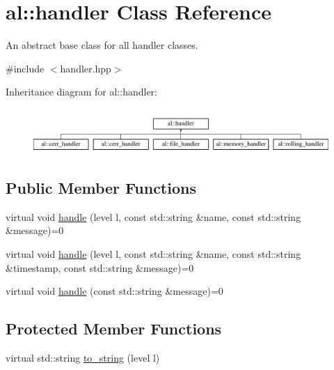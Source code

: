 \hypertarget{classal_1_1handler}{\section{al\-:\-:handler \-Class \-Reference}
\label{classal_1_1handler}
}


\-An abstract base class for all handler classes.  




{\ttfamily \#include $<$handler.\-hpp$>$}

\-Inheritance diagram for al\-:\-:handler\-:\begin{figure}[H]
\begin{center}
\leavevmode
\includegraphics[height=1.723077cm]{classal_1_1handler}
\end{center}
\end{figure}
\subsection*{\-Public \-Member \-Functions}
\begin{DoxyCompactItemize}
\item 
virtual void \hyperlink{classal_1_1handler_a29a3fb2757d02ed144cb71166aad1dfe}{handle} (level l, const std\-::string \&name, const std\-::string \&message)=0
\item 
virtual void \hyperlink{classal_1_1handler_a11ebca923dc7a3f8ffa3f802c5598cb0}{handle} (level l, const std\-::string \&name, const std\-::string \&timestamp, const std\-::string \&message)=0
\item 
virtual void \hyperlink{classal_1_1handler_af041d0c1de7e49607e27572f73413e82}{handle} (const std\-::string \&message)=0
\end{DoxyCompactItemize}
\subsection*{\-Protected \-Member \-Functions}
\begin{DoxyCompactItemize}
\item 
virtual std\-::string \hyperlink{classal_1_1handler_a46745146bc6348c43f6fd469df59ef2a}{to\-\_\-string} (level l)
\end{DoxyCompactItemize}


